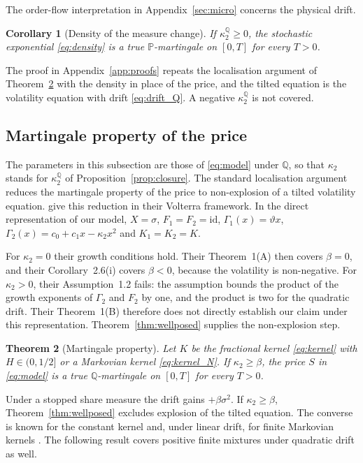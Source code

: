 \documentclass{rQUF2e}
\theoremstyle{plain}
\newtheorem{theorem}{Theorem}[section]
\newtheorem{corollary}[theorem]{Corollary}
\theoremstyle{definition}
\theoremstyle{remark}
\newcommand{\Q}{\mathbb{Q}}
\renewcommand{\P}{\mathbb{P}}
\begin{document}
The order-flow interpretation in Appendix~\ref{sec:micro} concerns the physical drift.

\begin{corollary}[Density of the measure change]\label{cor:density}
If $\kappa_2^{\Q}\ge0$, the stochastic exponential \eqref{eq:density} is a true $\P$-martingale on $[0,T]$ for every $T>0$.
\end{corollary}

The proof in Appendix~\ref{app:proofs} repeats the localisation argument of Theorem~\ref{thm:martingale} with the density in place of the price, and the tilted equation is the volatility equation with drift \eqref{eq:drift_Q}. A negative $\kappa_2^{\Q}$ is not covered.

\subsection{Martingale property of the price}

The parameters in this subsection are those of \eqref{eq:model} under $\Q$, so that $\kappa_2$ stands for $\kappa_2^{\Q}$ of Proposition~\ref{prop:closure}. The standard localisation argument reduces the martingale property of the price to non-explosion of a tilted volatility equation. \citet[Lemma~3.1]{GuyonJeanninJourdain2026} give this reduction in their Volterra framework. In the direct representation of our model, $X=\sigma$, $F_1=F_2=\mathrm{id}$, $\Gamma_1(x)=\vartheta x$, $\Gamma_2(x)=c_0+c_1x-\kappa_2x^2$ and $K_1=K_2=K$.

For $\kappa_2=0$ their growth conditions hold. Their Theorem~1(A) then covers $\beta=0$, and their Corollary~2.6(i) covers $\beta<0$, because the volatility is non-negative.
For $\kappa_2>0$, their Assumption~1.2 fails: the assumption bounds the product of the growth exponents of $\Gamma_2$ and $F_2$ by one, and the product is two for the quadratic drift. Their Theorem~1(B) therefore does not directly establish our claim under this representation. Theorem~\ref{thm:wellposed} supplies the non-explosion step.

\begin{theorem}[Martingale property]\label{thm:martingale}
Let $K$ be the fractional kernel \eqref{eq:kernel} with $H\in(0,1/2]$ or a Markovian kernel \eqref{eq:kernel_N}. If $\kappa_2\ge\beta$, the price $S$ in \eqref{eq:model} is a true $\Q$-martingale on $[0,T]$ for every $T>0$.
\end{theorem}

Under a stopped share measure the drift gains $+\beta\sigma^2$. If $\kappa_2\ge\beta$, Theorem~\ref{thm:wellposed} excludes explosion of the tilted equation. The converse is known for the constant kernel \citep[Theorem~3.7]{SeppRakhmonov2023} and, under linear drift, for finite Markovian kernels \citep[Corollary~2.6(ii)]{GuyonJeanninJourdain2026}. The following result covers positive finite mixtures under quadratic drift as well.
\end{document}
